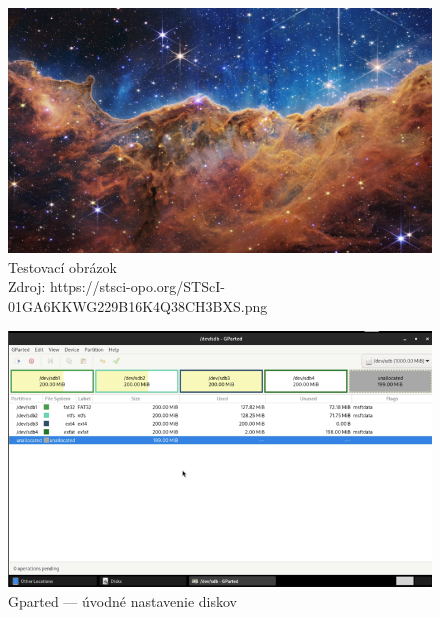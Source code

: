 \documentclass[12pt,oneside,slovak,a4paper]{article}
\begin{document}
\begin{figure}[H]
	\centering
	\captionsetup{justification=centering,margin=2cm}
	\includegraphics[width=\linewidth]{./images/testdisk_testing/NASA-JWST.png}
	\centering
	\caption{Testovací obrázok \\ Zdroj: https://stsci-opo.org/STScI-01GA6KKWG229B16K4Q38CH3BXS.png}
\end{figure}

\begin{figure}[H]
	\centering
	\captionsetup{justification=centering,margin=2cm}
	\includegraphics[scale=0.8]{./images/testdisk_testing/gparted-setup.png}
	\centering
	\caption{Gparted --- úvodné nastavenie diskov}
\end{figure}
\end{document}
